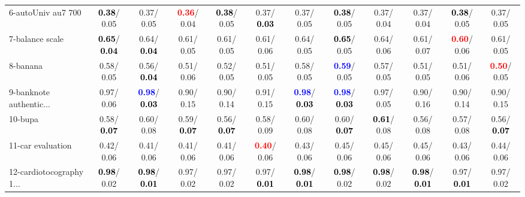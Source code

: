\begin{table}[h]
\begin{center}
{\begin{tabular}{lc|c|c|c|c|c|c|c|c|c|c}
6-autoUniv au7 700 & \textcolor{black}{\textbf{  0.38}}/  0.05 &   0.37/  0.05 & \textcolor{red}{\textbf{  0.36}}/  0.04 & \textcolor{black}{\textbf{  0.38}}/  0.05 &   0.37/\textcolor{black}{\textbf{  0.03}} &   0.37/  0.05 & \textcolor{black}{\textbf{  0.38}}/  0.05 &   0.37/  0.04 &   0.37/  0.04 & \textcolor{black}{\textbf{  0.38}}/  0.05 &   0.37/  0.05 \\
7-balance scale & \textcolor{black}{\textbf{  0.65}}/\textcolor{black}{\textbf{  0.04}} &   0.64/\textcolor{black}{\textbf{  0.04}} &   0.61/  0.05 &   0.61/  0.05 &   0.61/  0.06 &   0.64/  0.05 & \textcolor{black}{\textbf{  0.65}}/  0.05 &   0.64/  0.06 &   0.61/  0.07 & \textcolor{red}{\textbf{  0.60}}/  0.06 &   0.61/  0.05 \\ \hline
8-banana &   0.58/  0.05 &   0.56/\textcolor{black}{\textbf{  0.04}} &   0.51/  0.06 &   0.52/  0.05 &   0.51/  0.05 &   0.58/  0.05 & \textcolor{blue}{\textbf{  0.59}}/  0.05 &   0.57/  0.05 &   0.51/  0.05 &   0.51/  0.06 & \textcolor{red}{\textbf{  0.50}}/  0.05 \\
9-banknote authentic... &   0.97/  0.06 & \textcolor{blue}{\textbf{  0.98}}/\textcolor{black}{\textbf{  0.03}} &   0.90/  0.15 &   0.90/  0.14 &   0.91/  0.15 & \textcolor{blue}{\textbf{  0.98}}/\textcolor{black}{\textbf{  0.03}} & \textcolor{blue}{\textbf{  0.98}}/\textcolor{black}{\textbf{  0.03}} &   0.97/  0.05 &   0.90/  0.16 &   0.90/  0.14 &   0.90/  0.15 \\
10-bupa &   0.58/\textcolor{black}{\textbf{  0.07}} &   0.60/  0.08 &   0.59/\textcolor{black}{\textbf{  0.07}} &   0.56/\textcolor{black}{\textbf{  0.07}} &   0.58/  0.09 &   0.60/  0.08 &   0.60/\textcolor{black}{\textbf{  0.07}} & \textcolor{black}{\textbf{  0.61}}/  0.08 &   0.56/  0.08 &   0.57/  0.08 &   0.56/\textcolor{black}{\textbf{  0.07}} \\
11-car evaluation &   0.42/  0.06 &   0.41/  0.06 &   0.41/  0.06 &   0.41/  0.06 & \textcolor{red}{\textbf{  0.40}}/  0.06 &   0.43/  0.06 &   0.45/  0.06 &   0.45/  0.06 &   0.45/  0.06 &   0.43/  0.06 &   0.44/  0.06 \\
12-cardiotocography 1... & \textcolor{black}{\textbf{  0.98}}/  0.02 & \textcolor{black}{\textbf{  0.98}}/\textcolor{black}{\textbf{  0.01}} &   0.97/  0.02 &   0.97/  0.02 &   0.97/\textcolor{black}{\textbf{  0.01}} & \textcolor{black}{\textbf{  0.98}}/\textcolor{black}{\textbf{  0.01}} & \textcolor{black}{\textbf{  0.98}}/  0.02 & \textcolor{black}{\textbf{  0.98}}/  0.02 & \textcolor{black}{\textbf{  0.98}}/\textcolor{black}{\textbf{  0.01}} &   0.97/\textcolor{black}{\textbf{  0.01}} &   0.97/  0.02 \\

\end{tabular}}
\end{center}
\end{table}
